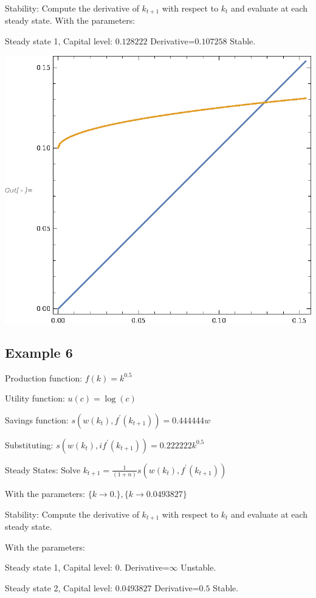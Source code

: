 \documentclass[11pt, a4paper]{article}
\begin{document}
Stability:             Compute the derivative of $k_{t+1}$ with respect to $k_{t}$ and evaluate at each steady state.
With the parameters:

\quad Steady state 1, Capital level: $0.128222$ Derivative=$0.107258$ Stable.

\includegraphics{xamples_gr5.eps}


\subsection*{Example 6}
Production function:    $f(k)=k^{0.5}$

Utility function:       $u(c)=\log(c)$

Savings function:       $s(w(k_t),f^\prime(k_{t+1}))= 0.444444 w$

Substituting:      $s(w(k_t),if^\prime(k_{t+1}))= 0.222222 k^{0.5}$

Steady States:          Solve ${k}_{t+1}= \frac{1}{(1+n)}s(w(k_t),f^\prime(k_{t+1}))$

With the parameters: $\{k\to 0.\},\{k\to 0.0493827\}$

Stability:             Compute the derivative of $k_{t+1}$ with respect to $k_{t}$ and evaluate at each steady state.

With the parameters:

\quad Steady state 1, Capital level: $0$. Derivative=$\infty$ Unstable.

\quad Steady state 2, Capital level: $0.0493827$ Derivative=$0.5$ Stable.
\end{document}
